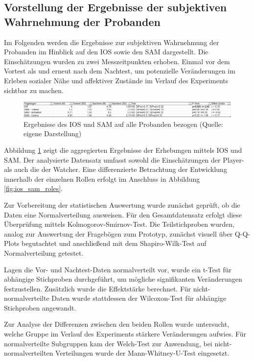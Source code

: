 \subsection{Vorstellung der Ergebnisse der subjektiven Wahrnehmung der Probanden}

Im Folgenden werden die Ergebnisse zur subjektiven Wahrnehmung der Probanden im Hinblick auf den \ac{IOS} sowie den \ac{SAM} dargestellt. Die Einschätzungen wurden zu zwei Messzeitpunkten erhoben. Einmal vor dem Vortest als  und erneut nach dem Nachtest, um potenzielle Veränderungen im Erleben sozialer Nähe und affektiver Zustände im Verlauf des Experiments sichtbar zu machen.

\begin{figure}[ht]
\centering
\includegraphics[width=1\linewidth]{content/pictures/IOS_SAM_Overal.png}
\caption{Ergebnisse des \ac{IOS} und \ac{SAM} auf alle Probanden bezogen (Quelle: eigene Darstellung)}
\label{fig:ios_sam_overal}
\end{figure}

Abbildung \ref{fig:ios_sam_overal} zeigt die aggregierten Ergebnisse der Erhebungen mittels \ac{IOS} und \ac{SAM}. Der analysierte Datensatz umfasst sowohl die Einschätzungen der Player- als auch die der Watcher. Eine differenzierte Betrachtung der Entwicklung innerhalb der einzelnen Rollen erfolgt im Anschluss in Abbildung \ref{fig:ios_sam_roles}.

Zur Vorbereitung der statistischen Auswertung wurde zunächst geprüft, ob die Daten eine Normalverteilung ausweisen. Für den Gesamtdatensatz erfolgt diese Überprüfung mittels Kolmogorov-Smirnov-Test. Die Teilstichproben wurden, analog zur Auswertung der Fragebögen zum Prototyp, zunächst visuell über \ac{Q-Q}-Plots begutachtet und anschließend mit dem Shapiro-Wilk-Test auf Normalverteilung getestet.

Lagen die Vor- und Nachtest-Daten normalverteilt vor, wurde ein t-Test für abhängige Stichproben durchgeführt, um mögliche signifikanten Veränderungen festzustellen. Zusätzlich wurde die Effektstärke berechnet. Für nicht-normalverteilte Daten wurde stattdessen der Wilcoxon-Test für abhängige Stichproben angewandt.

Zur Analyse der Differenzen zwischen den beiden Rollen wurde untersucht, welche Gruppe im Verlauf des Experiments stärkere Veränderungen aufwies. Für normalverteilte Subgruppen kam der Welch-Test zur Anwendung, bei nicht-normalverteilten Verteilungen wurde der Mann-Whitney-U-Test eingesetzt.

